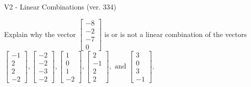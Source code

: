 \begin{exercise}
  \begin{exerciseTitle}V2 - Linear Combinations (ver. 334)\end{exerciseTitle}
  \begin{exerciseStatement}
    Explain why the vector \(\left[\begin{array}{c}
-8 \\
-2 \\
-7 \\
0
\end{array}\right]\)  is or is not a linear 
	combination of the vectors \(\left[\begin{array}{c}
-1 \\
2 \\
2 \\
-2
\end{array}\right] , \left[\begin{array}{c}
-2 \\
-2 \\
-3 \\
-2
\end{array}\right] , \left[\begin{array}{c}
1 \\
0 \\
1 \\
-2
\end{array}\right] , \left[\begin{array}{c}
2 \\
-1 \\
2 \\
2
\end{array}\right] , \text{ and } \left[\begin{array}{c}
3 \\
0 \\
3 \\
-1
\end{array}\right]\).
	



\end{exerciseStatement}
\end{exercise}
